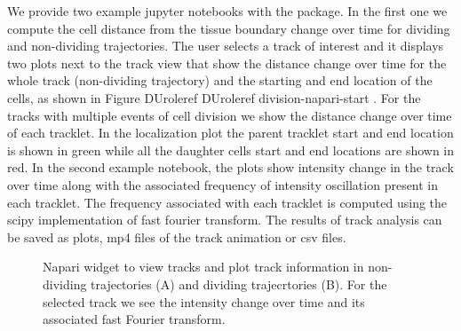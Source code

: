 \documentclass[letterpaper,compsoc,twoside]{IEEEtran}
\providecommand*{\DUrole}[2]{%
  \ifcsname DUrole#1\endcsname%
    \csname DUrole#1\endcsname{#2}%
  \else%
    #2%
  \fi%
}
\newenvironment{DUlegend}{\small}{}
\begin{document}
We provide two example jupyter notebooks with the package. In the first one we compute the cell distance from the tissue boundary change over time for dividing and non-dividing trajectories. The user selects a track of interest and it displays two plots next to the track view that show the distance change over time for the whole track (non-dividing trajectory) and the starting and end location of the cells, as shown in Figure \DUrole{ref}{division-napari-start}. For the tracks with multiple events of cell division we show the distance change over time of each tracklet. In the localization plot the parent tracklet start and end location is shown in green while all the daughter cells start and end locations are shown in red. In the second example notebook, the plots show intensity change in the track over time along with the associated frequency of intensity oscillation present in each tracklet. The frequency associated with each tracklet is computed using the scipy implementation of fast fourier transform. The results of track analysis can be saved as plots, mp4 files of the track animation or csv files.\begin{figure}[]\noindent{}
\caption{Napari widget to view tracks and plot track information in non-dividing trajectories (A) and dividing trajecrtories (B). For the selected track we see the intensity change over time and its associated fast Fourier transform.}
\begin{DUlegend}


\end{DUlegend}
\end{figure}
\end{document}
